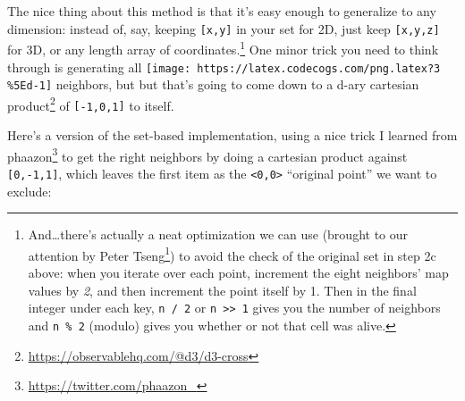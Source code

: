 \documentclass[]{article}
\renewcommand{\href}[2]{#2\footnote{\url{#1}}}
\begin{document}
The nice thing about this method is that it's easy enough to generalize to any
dimension: instead of, say, keeping \texttt{{[}x,y{]}} in your set for 2D, just
keep \texttt{{[}x,y,z{]}} for 3D, or any length array of coordinates.\footnote{And\ldots there's
  actually a neat optimization we can use (brought to our attention by
  \href{https://www.reddit.com/r/adventofcode/comments/kfb6zx/day_17_getting_to_t6_at_for_higher_spoilerss/ghmllf8}{Peter
  Tseng}) to avoid the check of the original set in step 2c above: when you
  iterate over each point, increment the eight neighbors' map values by
  \emph{2}, and then increment the point itself by 1. Then in the final integer
  under each key, \texttt{n\ /\ 2} or
  \texttt{n\ \textgreater{}\textgreater{}\ 1} gives you the number of neighbors
  and \texttt{n\ \%\ 2} (modulo) gives you whether or not that cell was alive.}
One minor trick you need to think through is generating all
\texttt{[image: https://latex.codecogs.com/png.latex?3\\\%5Ed-1]} neighbors, but
but that's going to come down to a d-ary
\href{https://observablehq.com/@d3/d3-cross}{cartesian product} of
\texttt{{[}-1,0,1{]}} to itself.

Here's a version of the set-based implementation, using a nice trick I learned
from \href{https://twitter.com/phaazon_}{phaazon} to get the right neighbors by
doing a cartesian product against \texttt{{[}0,-1,1{]}}, which leaves the first
item as the \texttt{\textless{}0,0\textgreater{}} ``original point'' we want to
exclude:
\end{document}
